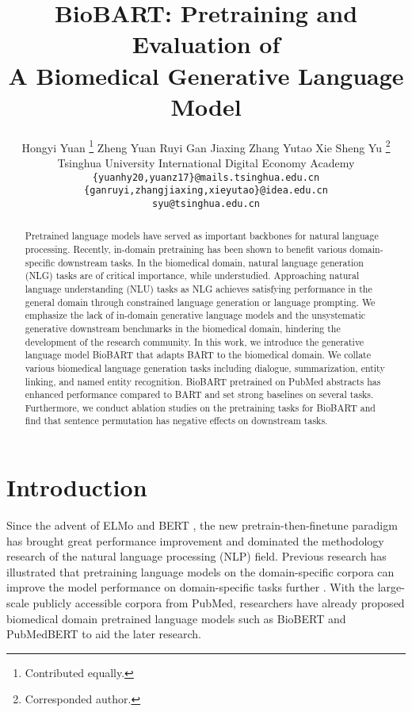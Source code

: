 \documentclass[11pt]{article}
\title{BioBART: Pretraining and Evaluation of \\ A Biomedical Generative Language Model}
\author{
Hongyi Yuan \thanks{Contributed equally.} \space\space
Zheng Yuan \samethanks \space\space\space
Ruyi Gan \space\space
Jiaxing Zhang \space\space
Yutao Xie \space\space
Sheng Yu \thanks{Corresponded author.} \\
Tsinghua University \space\space\space\space
International Digital Economy Academy\\
\texttt{\{yuanhy20,yuanz17\}@mails.tsinghua.edu.cn}\\
\texttt{\{ganruyi,zhangjiaxing,xieyutao\}@idea.edu.cn}\\
\texttt{syu@tsinghua.edu.cn}
}
\date{}
\begin{document}
\maketitle
\begin{abstract}
Pretrained language models have served as important backbones for natural language processing. Recently, in-domain pretraining has been shown to benefit various domain-specific downstream tasks. In the biomedical domain, natural language generation (NLG) tasks are of critical importance, while understudied. 
Approaching natural language understanding (NLU) tasks as NLG achieves satisfying performance in the general domain through constrained language generation or language prompting.
We emphasize the lack of in-domain generative language models and the unsystematic generative downstream benchmarks in the biomedical domain, hindering the development of the research community. 
In this work, we introduce the generative language model BioBART that adapts BART to the biomedical domain. 
We collate various biomedical language generation tasks including dialogue, summarization, entity linking, and named entity recognition.
BioBART pretrained on PubMed abstracts has enhanced performance compared to BART and set strong baselines on several tasks.
Furthermore, we conduct ablation studies on the pretraining tasks for BioBART and find that sentence permutation has negative effects on downstream tasks.
\end{abstract}

\section{Introduction}

Since the advent of ELMo \cite{elmo} and BERT \cite{Devlin2019BERTPO}, the new pretrain-then-finetune paradigm has brought great performance improvement and dominated the methodology research of the natural language processing (NLP) field. 
Previous research has illustrated that pretraining language models on the domain-specific corpora can improve the model performance on domain-specific tasks further \cite{Gururangan2020DontSP}. With the large-scale publicly accessible corpora from PubMed, researchers have already proposed biomedical domain pretrained language models such as BioBERT \cite{Lee2020BioBERTAP} and PubMedBERT \cite{pubmedbert} to aid the later research. 
\end{document}
